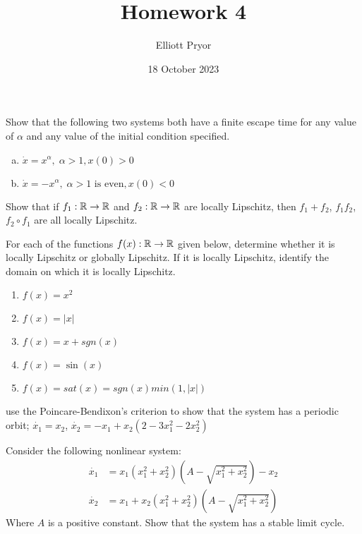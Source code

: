 \documentclass[11pt]{article}
\title{Homework 4}
\author{Elliott Pryor}
\date{18 October 2023}
\begin{document}
\maketitle

Show that the following two systems both have a finite escape time for any
value of $\alpha$ and any value of the initial condition specified.

\begin{enumerate}[(a)]
    \item $\dot{x} = x^\alpha, \; \alpha > 1, x(0) > 0$
    \item $\dot{x} = -x^\alpha, \; \alpha > 1 \text{ is even}, x(0) < 0$
\end{enumerate}

\soln





Show that if $f_1: \mathbb{R} \to \mathbb{R}$ and $f_2: \mathbb{R} \to \mathbb{R}$ are locally Lipschitz,
then $f_1 + f_2$, $f_1 f_2$, $f_2 \circ f_1$ are all locally Lipschitz.

\soln







For each of the functions $f(x): \mathbb{R} \to \mathbb{R}$ given below, determine whether it is
locally Lipschitz or globally Lipschitz. If it is locally Lipschitz, identify the domain on which
it is locally Lipschitz.

\begin{enumerate}
    \item $f(x) = x^2$
    \item $f(x) = |x|$
    \item $f(x) = x + sgn(x)$
    \item $f(x) = \sin(x)$
    \item $f(x) = sat(x) = sgn(x) min(1, |x|)$
\end{enumerate}

\soln





use the Poincare-Bendixon's criterion to
show that the system has a periodic orbit;
$\dot{x_1} = x_2$, $\dot{x_2} = -x_1 + x_2(2 - 3x_1^2 - 2 x_2^2)$

\soln



Consider the following nonlinear system:
\begin{align*}
    \dot{x_1} &= x_1 (x_1^2 + x_2^2)(A - \sqrt{x_1^2 + x_2^2}) - x_2\\
    \dot{x_2} &= x_1 + x_2 (x_1^2 + x_2^2)(A - \sqrt{x_1^2 + x_2^2})
\end{align*}
Where $A$ is a positive constant. 
Show that the system has a stable limit cycle.
\end{document}
